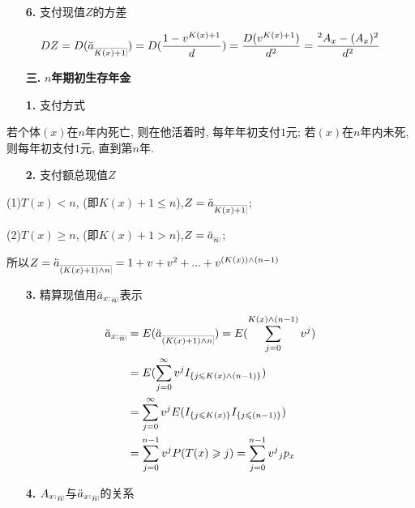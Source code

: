 \documentclass[a4paper,10pt]{ctexbook}
\makeatletter
\newcommand{\hei}{\CJKfamily{hei}}      %
\DeclareRobustCommand{\annu}[1]{_{%
    \def\arraystretch{0}%
    \setlength\arraycolsep{1pt}%
    \setlength\arrayrulewidth{.2pt}%
    \begin{array}[b]{@{}c|}\hline
        \\[\arraycolsep]%
        \scriptstyle #1%
    \end{array}%
}}
\makeatother
\begin{document}
\begin{itemize}
    \item[{\bf\hei 6.}]支付现值$Z$的方差
\end{itemize}

\begin{align*}
    DZ=D(\ddot a_{\annu {K(x)+1}})=D(\frac{1-v^{K(x)+1}}{d})=\frac{D(v^{K(x)+1})}{d^2}=\frac{{}^2A_x-(A_x)^2}{d^2}
\end{align*}

\begin{itemize}
    \item[{\bf\hei 三.}]{\bf\hei $n$年期初生存年金}
\end{itemize}

\begin{itemize}
    \item[{\bf\hei 1.}]支付方式
\end{itemize}

若个体$(x)$在$n$年内死亡, 则在他活着时, 每年年初支付$1$元; 若$(x)$在$n$年内未死, 则每年初支付$1$元, 直到第$n$年.

\begin{itemize}
    \item[{\bf\hei 2.}]支付额总现值$Z$
\end{itemize}

(1)$T(x)<n$, (即$K(x)+1\leqslant n$),$Z=\ddot a_{\annu {K(x)+1}}$;

(2)$T(x)\geqslant n$, (即$K(x)+1>n$),$Z=\ddot a_{\annu {n}}$;

所以$Z=\ddot a_{\annu {(K(x)+1)\land n}}=1+v+v^2+...+v^{(K(x))\land (n-1)}$
\begin{itemize}
    \item[{\bf\hei 3.}]精算现值用$\ddot a_{x:}{}_{\annu n}$表示
\end{itemize}
\begin{align*}
    \ddot a_{x:}{}_{\annu n} & = E(\ddot a_{\annu {(K(x)+1)\land n}})=E(\sum_{j=0}^{K(x)\land (n-1)}{v^j}) \\
                             & =E(\sum_{j=0}^{\infty}{v^j}I_{\{j\leqslant K(x)\land(n-1)\}})               \\
                             & =\sum_{j=0}^{\infty}{v^j}E(I_{\{j\leqslant K(x)\}}I_{\{j\leqslant (n-1)\}}) \\
                             & =\sum_{j=0}^{n-1}{v^j}P(T(x)\geqslant j)=\sum_{j=0}^{n-1}{v^j}{}_j p_x      \\
\end{align*}

\begin{itemize}
    \item[{\bf\hei 4.}]$A_{x:}{}_{\annu n}$与$\ddot a_{x:}{}_{\annu n}$的关系
\end{itemize}
\end{document}
